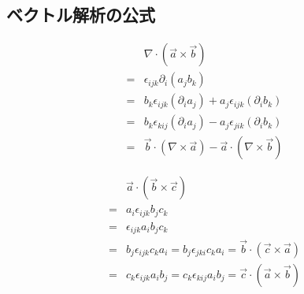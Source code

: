 \subsection{ベクトル解析の公式}


\begin{align}
&\nabla\cdot\left(\vec{a}\times\vec{b}\right)\\
=&\epsilon_{ijk}\partial_i\left(a_jb_k\right)\\
=&b_k\epsilon_{ijk}\left(\partial_ia_j\right)
 +a_j\epsilon_{ijk}\left(\partial_ib_k\right)\\
=&b_k\epsilon_{kij}\left(\partial_ia_j\right)
 -a_j\epsilon_{jik}\left(\partial_ib_k\right)\\
=&\vec{b}\cdot\left(\nabla\times\vec{a}\right)
 -\vec{a}\cdot\left(\nabla\times\vec{b}\right)
\end{align}

\begin{align}
&\vec{a}\cdot\left(\vec{b}\times\vec{c}\right)\\
=&a_i\epsilon_{ijk}b_jc_k\\
=&\epsilon_{ijk}a_ib_jc_k\\
=&b_j\epsilon_{ijk}c_ka_i=b_j\epsilon_{jki}c_ka_i
 =\vec{b}\cdot\left(\vec{c}\times\vec{a}\right)\\
=&c_k\epsilon_{ijk}a_ib_j=c_k\epsilon_{kij}a_ib_j
 =\vec{c}\cdot\left(\vec{a}\times\vec{b}\right)
\end{align}